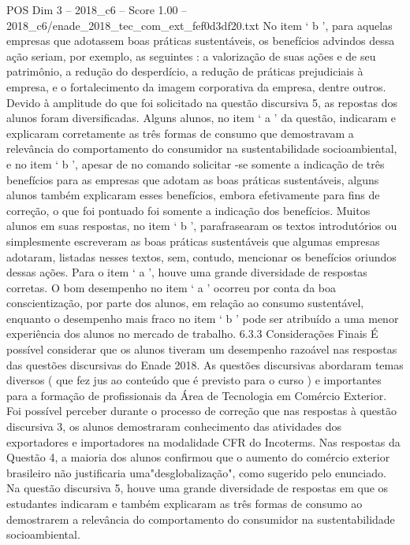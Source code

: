 \begin{textsample}{POS Dim 3 – 2018\_c6 – Score 1.00 – 2018\_c6/enade\_2018\_tec\_com\_ext\_fef0d3df20.txt}
No item ‘ b ’, para aquelas empresas que adotassem boas práticas sustentáveis, os benefícios advindos dessa ação seriam, por exemplo, as seguintes : a valorização de suas ações e de seu patrimônio, a redução do desperdício, a redução de práticas prejudiciais à empresa, e o fortalecimento da imagem corporativa da empresa, dentre outros.
Devido à amplitude do que foi solicitado na questão discursiva 5, as repostas dos alunos foram diversificadas.
Alguns alunos, no item ‘ a ’ da questão, indicaram e explicaram corretamente as três formas de consumo que demostravam a relevância do comportamento do consumidor na sustentabilidade socioambiental, e no item ‘ b ’, apesar de no comando solicitar -se somente a indicação de três benefícios para as empresas que adotam as boas práticas sustentáveis, alguns alunos também explicaram esses benefícios, embora efetivamente para fins de correção, o que foi pontuado foi somente a indicação dos benefícios.
Muitos alunos em suas respostas, no item ‘ b ’, parafrasearam os textos introdutórios ou simplesmente escreveram as boas práticas sustentáveis que algumas empresas adotaram, listadas nesses textos, sem, contudo, mencionar os benefícios oriundos dessas ações.
Para o item ‘ a ’, houve uma grande diversidade de respostas corretas.
O bom desempenho no item ‘ a ’ ocorreu por conta da boa conscientização, por parte dos alunos, em relação ao consumo sustentável, enquanto o desempenho mais fraco no item ‘ b ’ pode ser atribuído a uma menor experiência dos alunos no mercado de trabalho. 6.3.3 Considerações Finais É possível considerar que os alunos tiveram um desempenho razoável nas respostas das questões discursivas do Enade 2018.
As questões discursivas abordaram temas diversos ( que fez jus ao conteúdo que é previsto para o curso ) e importantes para a formação de profissionais da Área de Tecnologia em Comércio Exterior.
Foi possível perceber durante o processo de correção que nas respostas à questão discursiva 3, os alunos demostraram conhecimento das atividades dos exportadores e importadores na modalidade CFR do Incoterms.
Nas respostas da Questão 4, a maioria dos alunos confirmou que o aumento do comércio exterior brasileiro não justificaria uma"desglobalização", como sugerido pelo enunciado.
Na questão discursiva 5, houve uma grande diversidade de respostas em que os estudantes indicaram e também explicaram as três formas de consumo ao demostrarem a relevância do comportamento do consumidor na sustentabilidade socioambiental.

\end{textsample}
